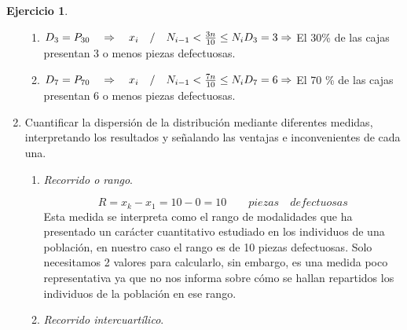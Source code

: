 \documentclass[a4paper, 12pt]{article}
\theoremstyle{definition}
\newtheorem{ej}{Ejercicio}
\begin{document}
\begin{ej}
\begin{enumerate}[label=\textit{\alph*)}]
    \begin{center}
    \end{center}
    
    \begin{enumerate}[label=]
        \item \(D_3 = P_{30}\quad\Rightarrow\quad x_i\quad/\quad N_{i-1} < \frac{3n}{10} \leq N_i \\D_3 = 3 \Rightarrow\) El 30\% de las cajas presentan 3 o menos piezas defectuosas.
        \item \(D_7 = P_{70}\quad\Rightarrow\quad x_i\quad/\quad N_{i-1} < \frac{7n}{10} \leq N_i \\D_7 = 6 \Rightarrow\) El 70 \% de las cajas presentan 6 o menos piezas defectuosas.
    \end{enumerate}
    \item Cuantificar la dispersión de la distribución mediante diferentes medidas, interpretando los resultados y señalando las ventajas e inconvenientes de cada una.
    \begin{enumerate}[label=\arabic*)]
        \item \textit{Recorrido o rango}.
        
            \begin{center}
            \end{center}
            
        
        \[
        R = x_k - x_1 = 10 - 0 = 10\qquad piezas\quad defectuosas
        \]
        Esta medida se interpreta como el rango de modalidades que ha presentado un carácter cuantitativo estudiado en los individuos de una población, en nuestro caso el rango es de 10 piezas defectuosas. Solo necesitamos 2 valores para calcularlo, sin embargo, es una medida poco representativa ya que no nos informa sobre cómo se hallan repartidos los individuos de la población en ese rango.
        \item \textit{Recorrido intercuartílico}.
        

\end{enumerate}
\end{enumerate}
\end{ej}
\end{document}

